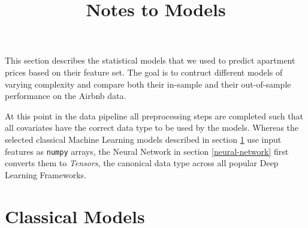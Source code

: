 \documentclass[12pt, letterpaper]{article}
\title{Notes to Models}
\author{}
\date{}
\begin{document}
\maketitle

This section describes the statistical models that we used to predict apartment prices based on their feature set.
The goal is to contruct different models of varying complexity and compare both their in-sample and their out-of-sample performance on the Airbnb data.

At this point in the data pipeline all preprocessing steps are completed such that all covariates have the correct data type to be used by the models.
Whereas the selected classical Machine Learning models described in section \ref{classical-models} use input features as \texttt{numpy} arrays, the Neural Network in section \ref{neural-network} first converts them to \emph{Tensors}, the canonical data type across all popular Deep Learning Frameworks.

\section{Classical Models} \label{classical-models}
\end{document}
